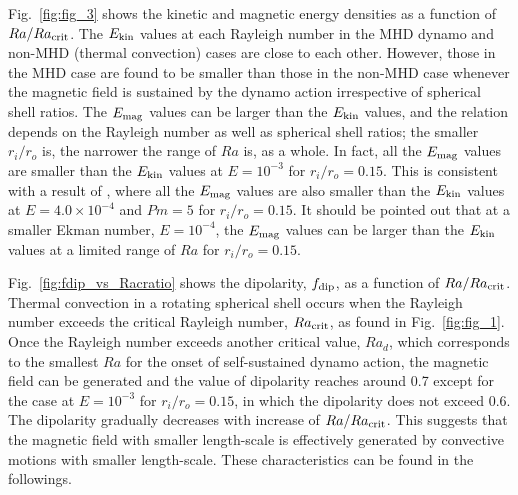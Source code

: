 Fig.~\ref{fig:fig_3} shows the kinetic and magnetic energy densities as a function of $Ra / Ra_{\rm crit}$.
The $E_{\rm kin}$ values at each Rayleigh number in the MHD dynamo and non-MHD (thermal convection) cases are close to each other.
However, those in the MHD case are found to be smaller than those in the non-MHD case whenever the magnetic field is sustained by the dynamo action irrespective of spherical shell ratios.
The $E_{\rm mag}$ values can be larger than the $E_{\rm kin}$ values, and the relation depends on the Rayleigh number as well as spherical shell ratios; the smaller $r_i / r_o$ is, the narrower the range of $Ra$ is, as a whole.
In fact, all the $E_{\rm mag}$ values are smaller than the $E_{\rm kin}$ values at $E = 10^{-3}$ for $r_i / r_o = 0.15$.
This is consistent with a result of \citet{Heimpel:2005}, where all the $E_{\rm mag}$ values are also smaller than the $E_{\rm kin}$ values at $E = 4.0 \times 10^{-4}$ and $Pm = 5$ for $r_i / r_o = 0.15$.
It should be pointed out that at a smaller Ekman number, $E = 10^{-4}$, the $E_{\rm mag}$ values can be larger than the $E_{\rm kin}$ values at a limited range of $Ra$ for $r_i / r_o = 0.15$.
%

%

Fig.~\ref{fig:fdip_vs_Racratio} shows the dipolarity, $f_{\rm dip}$, as a function of $Ra / Ra_{\rm crit}$.
Thermal convection in a rotating spherical shell occurs when the Rayleigh number exceeds the critical Rayleigh number, $Ra_{\rm crit}$, as found in Fig.~\ref{fig:fig_1}.
Once the Rayleigh number exceeds another critical value, $Ra_d$, which corresponds to the smallest $Ra$ for the onset of self-sustained dynamo action, the magnetic field can be generated and the value of dipolarity reaches around 0.7 except for the case at $E = 10^{-3}$ for $r_i/r_o = 0.15$, in which the dipolarity does not exceed 0.6.
The dipolarity gradually decreases with increase of $Ra / Ra_{\rm crit}$.
This suggests that the magnetic field with smaller length-scale is effectively generated by convective motions with smaller length-scale.
These characteristics can be found in the followings.






